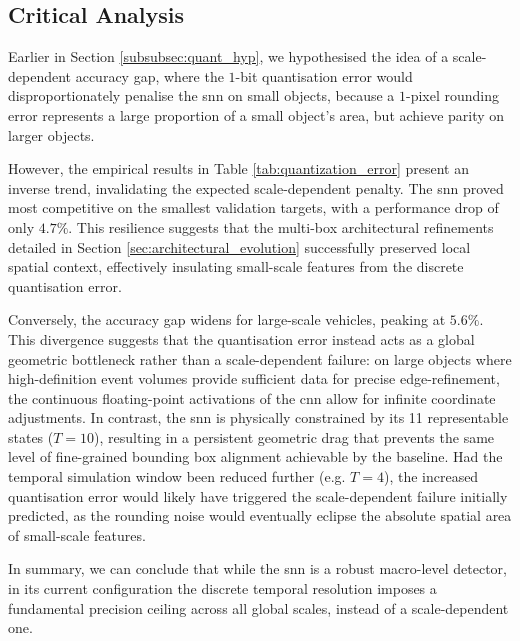 \subsection*{Critical Analysis}

Earlier in Section \ref{subsubsec:quant_hyp}, we hypothesised the idea of a scale-dependent accuracy gap,
where the $1$-bit quantisation error would disproportionately penalise the \gls{snn} on small objects,
because a $1$-pixel rounding error represents a large proportion of a small object's area, but achieve parity on larger objects.

However, the empirical results in Table \ref{tab:quantization_error} present an inverse trend, invalidating the expected scale-dependent penalty.
The \gls{snn} proved most competitive on the smallest validation targets, with a performance drop of only $4.7\%$.
This resilience suggests that the multi-box architectural refinements detailed in Section \ref{sec:architectural_evolution}
successfully preserved local spatial context, effectively insulating small-scale features from the discrete quantisation error.

Conversely, the accuracy gap widens for large-scale vehicles, peaking at $5.6\%$.
This divergence suggests that the quantisation error instead acts as a global geometric bottleneck rather than a scale-dependent failure:
on large objects where high-definition event volumes provide sufficient data for precise edge-refinement,
the continuous floating-point activations of the \gls{cnn} allow for infinite coordinate adjustments.
In contrast, the \gls{snn} is physically constrained by its 11 representable states ($T=10$), 
resulting in a persistent geometric drag that prevents the same level of fine-grained bounding box alignment achievable by the baseline.
Had the temporal simulation window been reduced further (e.g. $T=4$), the increased quantisation error would likely have triggered the scale-dependent failure initially predicted, 
as the rounding noise would eventually eclipse the absolute spatial area of small-scale features.

In summary, we can conclude that while the \gls{snn} is a robust macro-level detector, in its current configuration the discrete temporal resolution
imposes a fundamental precision ceiling across all global scales, instead of a scale-dependent one.